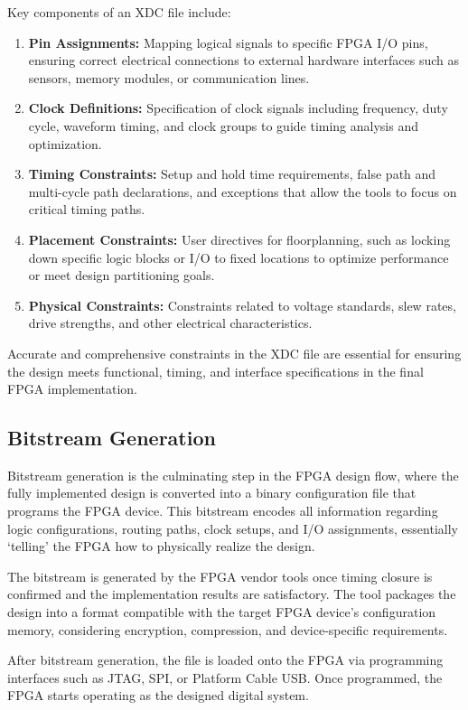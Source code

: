 Key components of an XDC file include:
\begin{enumerate}
	\item \textbf{Pin Assignments:} Mapping logical signals to specific FPGA I/O pins, ensuring correct electrical connections to external hardware interfaces such as sensors, memory modules, or communication lines.
	\item \textbf{Clock Definitions:} Specification of clock signals including frequency, duty cycle, waveform timing, and clock groups to guide timing analysis and optimization.
	\item \textbf{Timing Constraints:} Setup and hold time requirements, false path and multi-cycle path declarations, and exceptions that allow the tools to focus on critical timing paths.
	\item \textbf{Placement Constraints:} User directives for floorplanning, such as locking down specific logic blocks or I/O to fixed locations to optimize performance or meet design partitioning goals.
	\item \textbf{Physical Constraints:} Constraints related to voltage standards, slew rates, drive strengths, and other electrical characteristics. 
\end{enumerate}

Accurate and comprehensive constraints in the XDC file are essential for ensuring the design meets functional, timing, and interface specifications in the final FPGA implementation.

\subsection{Bitstream Generation}
Bitstream generation is the culminating step in the FPGA design flow, where the fully implemented design is converted into a binary configuration file that programs the FPGA device. This bitstream encodes all information regarding logic configurations, routing paths, clock setups, and I/O assignments, essentially ‘telling’ the FPGA how to physically realize the design.

The bitstream is generated by the FPGA vendor tools once timing closure is confirmed and the implementation results are satisfactory. The tool packages the design into a format compatible with the target FPGA device’s configuration memory, considering encryption, compression, and device-specific requirements.

After bitstream generation, the file is loaded onto the FPGA via programming interfaces such as JTAG, SPI, or Platform Cable USB. Once programmed, the FPGA starts operating as the designed digital system.

